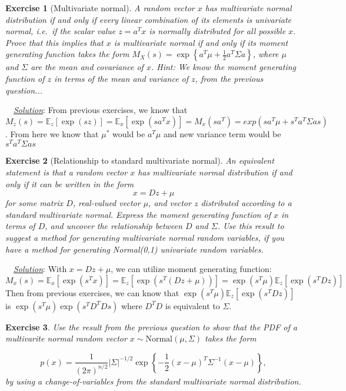 \documentclass[twoside]{article}
\newcounter{lecnum}
\newtheorem{exercise}{Exercise}[lecnum]
\newenvironment{solution}{
  \begin{flushleft} \noindent ~~\underline{\emph{Solution}}: \rmfamily}{\end{flushleft}}
\newcommand\E{\mathbb{E}}
\begin{document}
\begin{exercise}[Multivariate normal]
  A random vector $x$ has multivariate normal distribution if and only if every linear combination of its elements is univariate normal, i.e.\ if the scalar value $z = a^Tx$ is normally distributed for all possible $x$. Prove that this implies that $x$ is multivariate normal if and only if its moment generating function takes the form $M_X(s) = \exp\left\{a^T\mu + \frac{1}{2}a^T\Sigma a\right\}$, where $\mu$ and $\Sigma$ are the mean and covariance of $x$. \textit{Hint: We know the moment generating function of $z$ in terms of the mean and variance of $z$, from the previous question...}
\end{exercise}

\begin{solution}
From previous exercises, we know that $M_z(s) = \E_z[\exp(sz)]= \E_x[\exp(s a^Tx)]= M_x(sa^T) = exp(s a^T \mu + s^Ta^T\Sigma as)  $. From here we know that $\mu^*$ would be $a^T\mu$ and new variance term would be $s^{T}a^{T}\Sigma as$
\end{solution}
  
\begin{exercise}[Relationship to standard multivariate normal]
  An equivalent statement is that a random vector $x$ has multivariate normal distribution if and only if it can be written in the form
  $$x = Dz + \mu$$
  for some matrix $D$, real-valued vector $\mu$, and vector $z$ distributed according to a standard multivariate normal. Express the moment generating function of $x$ in terms of $D$, and uncover the relationship between $D$ and $\Sigma$. Use this result to suggest a method for generating multivariate normal random variables, if you have a method for generating Normal(0,1) univariate random variables.
\end{exercise}

\begin{solution}
With $x = Dz+\mu$, we can utilize moment generating function:
\begin{equation}
M_x(s) = \E_x[\exp(s^T x)] =  \E_z[\exp(s^T(Dz+\mu))] = \exp(s^T\mu)\E_z[\exp(s^T{Dz})]
\end{equation}
Then from previous exercises, we can know that $ \exp(s^T\mu)\E_z[\exp(s^T{Dz})] $ is $\exp(s^T\mu)\exp(s^TD^T Ds)$ where $D^TD$ is equivalent to $\Sigma$.
\end{solution}

\begin{exercise}
  Use the result from the previous question to show that the PDF of a multivarite normal random vector $x\sim\mbox{Normal}(\mu, \Sigma)$ takes the form

  $$p(x) = \frac{1}{(2\pi)^{n/2}}|\Sigma|^{-1/2}\exp\left\{-\frac{1}{2}(x-\mu)^T\Sigma^{-1}(x-\mu)\right\},$$
by using a change-of-variables from the standard multivariate normal distribution.
\end{exercise}
\end{document}
